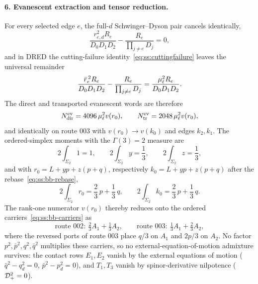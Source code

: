 \paragraph{6. Evanescent extraction and tensor reduction.} For every selected
edge $e$, the full-$d$ Schwinger--Dyson pair cancels identically,
\begin{equation}\label{eq:ss:bb-sdpair}
\frac{r_{e,d}^{2}R_e}{D_0D_1D_2}-\frac{R_e}{\prod_{j\ne e}D_j}=0,
\end{equation}
and in DRED the cutting-failure identity~\eqref{eq:ss:cuttingfailure} leaves
the universal remainder
\begin{equation}\label{eq:ss:bb-dredremainder}
\frac{\bar r_e^{\,2}R_e}{D_0D_1D_2}-\frac{R_e}{\prod_{j\ne e}D_j}
=\frac{\mu_\ell^{2}R_e}{D_0D_1D_2}.
\end{equation}
The direct and transported evanescent words are therefore
\begin{equation}\label{eq:ss:bb-evanescent}
N^{\mathrm{ev}}_{\mathrm{dir}}=4096\,\mu_\ell^{2}v(r_0),
\qquad
N^{\mathrm{ev}}_{\mathrm{tr}}=2048\,\mu_\ell^{2}v(r_0),
\end{equation}
and identically on route 003 with $v(r_0)\to v(k_0)$ and edges $k_2,k_1$. The
ordered-simplex moments with the $\Gamma(3)=2$ measure are
\begin{equation}\label{eq:ss:bb-simplex}
2\int_{\Sigma_2}1=1,\qquad 2\int_{\Sigma_2}y=\frac13,\qquad 2\int_{\Sigma_2}z=\frac13,
\end{equation}
and with $r_0=L+yp+z(p+q)$, respectively $k_0=L+yp+z(p+q)$ after the
rebase~\eqref{eq:ss:bb-rebase},
\begin{equation}\label{eq:ss:bb-shift}
2\int_{\Sigma_2}r_0=\frac23\,p+\frac13\,q,
\qquad
2\int_{\Sigma_2}k_0=\frac23\,p+\frac13\,q .
\end{equation}
The rank-one numerator $v(r_0)$ thereby reduces onto the ordered
carriers~\eqref{eq:ss:bb-carriers} as
\begin{equation}\label{eq:ss:bb-carrierreduction}
\text{route }002:\ \tfrac23 A_1+\tfrac13 A_2,
\qquad
\text{route }003:\ \tfrac13 A_1+\tfrac23 A_2,
\end{equation}
where the reversed ports of route 003 place $q/3$ on $A_1$ and $2p/3$ on
$A_2$. No factor $p^{2},\bar p^{2},q^{2},\bar q^{2}$ multiplies these
carriers, so no external-equation-of-motion admixture survives: the contact
rows $E_1,E_2$ vanish by the external equations of motion
($\bar q^{2}-q_d^{2}=0$, $\bar p^{2}-p_d^{2}=0$), and $T_1,T_3$ vanish by
spinor-derivative nilpotence ($\mathcal{D}_+^{2}=0$).

